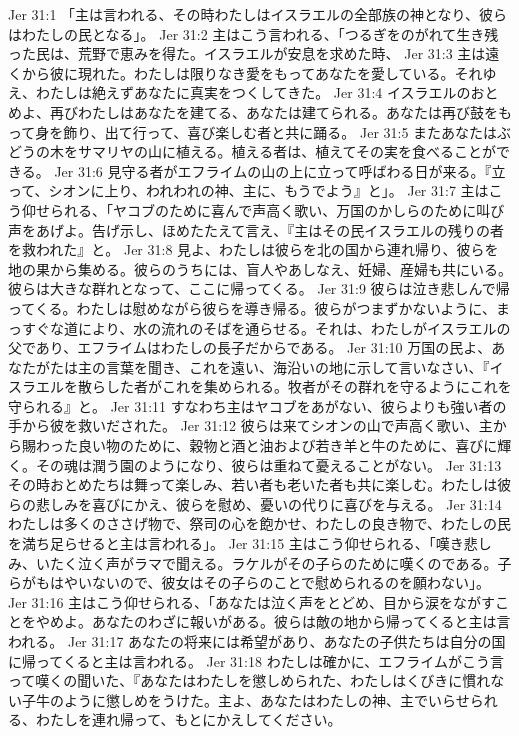 Jer 31:1  「主は言われる、その時わたしはイスラエルの全部族の神となり、彼らはわたしの民となる」。
Jer 31:2  主はこう言われる、「つるぎをのがれて生き残った民は、荒野で恵みを得た。イスラエルが安息を求めた時、
Jer 31:3  主は遠くから彼に現れた。わたしは限りなき愛をもってあなたを愛している。それゆえ、わたしは絶えずあなたに真実をつくしてきた。
Jer 31:4  イスラエルのおとめよ、再びわたしはあなたを建てる、あなたは建てられる。あなたは再び鼓をもって身を飾り、出て行って、喜び楽しむ者と共に踊る。
Jer 31:5  またあなたはぶどうの木をサマリヤの山に植える。植える者は、植えてその実を食べることができる。
Jer 31:6  見守る者がエフライムの山の上に立って呼ばわる日が来る。『立って、シオンに上り、われわれの神、主に、もうでよう』と」。
Jer 31:7  主はこう仰せられる、「ヤコブのために喜んで声高く歌い、万国のかしらのために叫び声をあげよ。告げ示し、ほめたたえて言え、『主はその民イスラエルの残りの者を救われた』と。
Jer 31:8  見よ、わたしは彼らを北の国から連れ帰り、彼らを地の果から集める。彼らのうちには、盲人やあしなえ、妊婦、産婦も共にいる。彼らは大きな群れとなって、ここに帰ってくる。
Jer 31:9  彼らは泣き悲しんで帰ってくる。わたしは慰めながら彼らを導き帰る。彼らがつまずかないように、まっすぐな道により、水の流れのそばを通らせる。それは、わたしがイスラエルの父であり、エフライムはわたしの長子だからである。
Jer 31:10  万国の民よ、あなたがたは主の言葉を聞き、これを遠い、海沿いの地に示して言いなさい、『イスラエルを散らした者がこれを集められる。牧者がその群れを守るようにこれを守られる』と。
Jer 31:11  すなわち主はヤコブをあがない、彼らよりも強い者の手から彼を救いだされた。
Jer 31:12  彼らは来てシオンの山で声高く歌い、主から賜わった良い物のために、穀物と酒と油および若き羊と牛のために、喜びに輝く。その魂は潤う園のようになり、彼らは重ねて憂えることがない。
Jer 31:13  その時おとめたちは舞って楽しみ、若い者も老いた者も共に楽しむ。わたしは彼らの悲しみを喜びにかえ、彼らを慰め、憂いの代りに喜びを与える。
Jer 31:14  わたしは多くのささげ物で、祭司の心を飽かせ、わたしの良き物で、わたしの民を満ち足らせると主は言われる」。
Jer 31:15  主はこう仰せられる、「嘆き悲しみ、いたく泣く声がラマで聞える。ラケルがその子らのために嘆くのである。子らがもはやいないので、彼女はその子らのことで慰められるのを願わない」。
Jer 31:16  主はこう仰せられる、「あなたは泣く声をとどめ、目から涙をながすことをやめよ。あなたのわざに報いがある。彼らは敵の地から帰ってくると主は言われる。
Jer 31:17  あなたの将来には希望があり、あなたの子供たちは自分の国に帰ってくると主は言われる。
Jer 31:18  わたしは確かに、エフライムがこう言って嘆くの聞いた、『あなたはわたしを懲しめられた、わたしはくびきに慣れない子牛のように懲しめをうけた。主よ、あなたはわたしの神、主でいらせられる、わたしを連れ帰って、もとにかえしてください。
